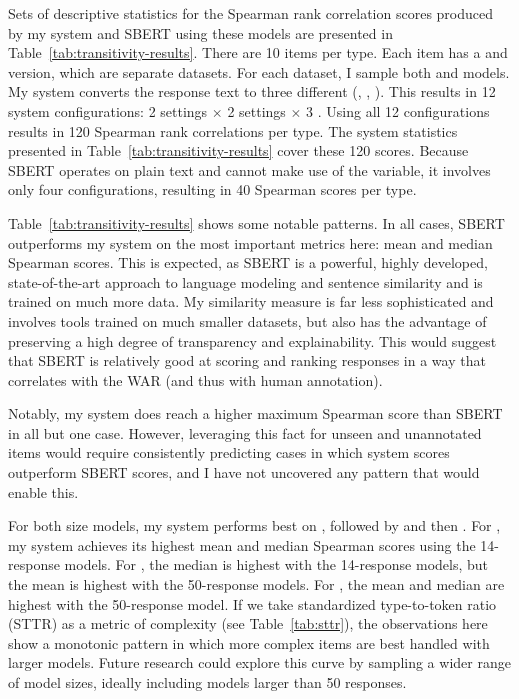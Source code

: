 Sets of descriptive statistics for the Spearman rank correlation scores produced by my system and SBERT using these models are presented in Table~\ref{tab:transitivity-results}. There are 10 items per type. Each item has a  and  version, which are separate datasets. For each dataset, I sample both  and  models. My system converts the response text to three different  (, , ). This results in 12 system configurations: 2  settings $\times$ 2  settings $\times$ 3 . Using all 12 configurations results in 120 Spearman rank correlations per  type. The system statistics presented in Table~\ref{tab:transitivity-results} cover these 120 scores. Because SBERT operates on plain text and cannot make use of the  variable, it involves only four configurations, resulting in 40 Spearman scores per  type.

Table~\ref{tab:transitivity-results} shows some notable patterns. In all cases, SBERT outperforms my system on the most important metrics here: mean and median Spearman scores. This is expected, as SBERT is a powerful, highly developed, state-of-the-art approach to language modeling and sentence similarity and is trained on much more data. My similarity measure is far less sophisticated and involves tools trained on much smaller datasets, but also has the advantage of preserving a high degree of transparency and explainability. This would suggest that SBERT is relatively good at scoring and ranking responses in a way that correlates with the WAR (and thus with human annotation).

Notably, my system does reach a higher maximum Spearman score than SBERT in all but one case. However, leveraging this fact for unseen and unannotated items would require consistently predicting cases in which system scores outperform SBERT scores, and I have not uncovered any pattern that would enable this.

For both size models, my system performs best on , followed by  and then . For , my system achieves its highest mean and median Spearman scores using the 14-response models. For , the median is highest with the 14-response models, but the mean is highest with the 50-response models. For , the mean and median are highest with the 50-response model. If we take standardized type-to-token ratio (STTR) as a metric of complexity (see Table~\ref{tab:sttr}), the observations here show a monotonic pattern in which more complex items are best handled with larger models. Future research could explore this curve by sampling a wider range of model sizes, ideally including models larger than 50 responses.

